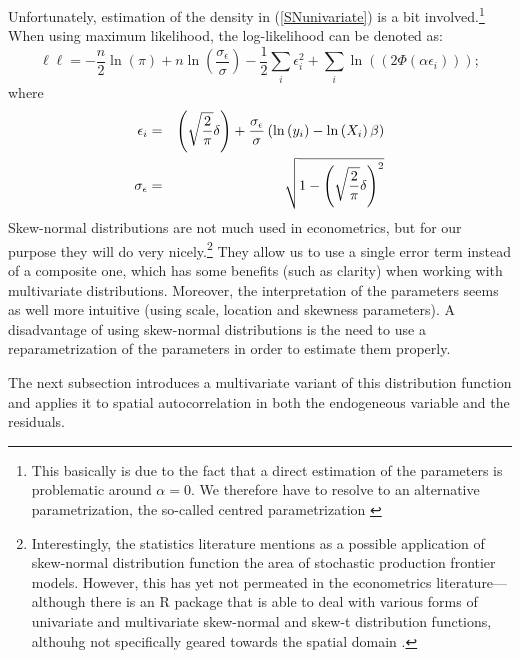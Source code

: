 \documentclass[11pt,parskip,abstracton,notitlepage]{scrartcl}
\begin{document}
Unfortunately, estimation of the density in (\ref{SNunivariate}) is a bit involved.\footnote{This basically is due to the fact that a direct estimation of the parameters is problematic around $\alpha = 0$. We therefore have to resolve to an alternative parametrization, the so-called centred parametrization \citep[see as well][]{arellano2008centred}} When using maximum likelihood, the log-likelihood can be denoted as:
%
\begin{equation}
\ell\ell  = - \frac{n}{2}\ln \left(\pi \right) + n \ln \left( \frac{\sigma_\epsilon }{\sigma}\right) - 	\frac{1}{2}\sum_i{\epsilon _i^2} + 
						  \sum_i{ \ln \left((2\Phi(\alpha \epsilon _i))\right)};
\label{eq:}
\end{equation}
%
where 
\begin{eqnarray}
\epsilon _i & =& \left(\sqrt \frac{2}{\pi}\delta\right)+\frac{\sigma_\epsilon }{\sigma} \left(\ln \left(y_i\right)  -\ln \left(X_i\right) \beta \right)\notag \\
\sigma_\epsilon  &=& \sqrt{1-\left(\sqrt \frac{2}{\pi}\delta\right)^2}
\label{eq:centeredparameters}
\end{eqnarray}
%
Skew-normal distributions are not much used in econometrics, but for our purpose they will do very nicely.\footnote{Interestingly, the statistics literature mentions as a possible application of skew-normal distribution function the area of stochastic production frontier models. However, this has yet not permeated in the econometrics literature---although there is an R package that is able to deal with various forms of univariate and multivariate skew-normal and skew-t distribution functions, althouhg not specifically geared towards the spatial domain \citep{packagesn}.} They allow us to use a single error term instead of a composite one, which has some benefits (such as clarity) when working with multivariate distributions. Moreover, the interpretation of the parameters seems as well more intuitive (using scale, location and skewness parameters). A disadvantage of using skew-normal distributions is the need to use a reparametrization of the parameters in order to estimate them properly.

The next subsection introduces a multivariate variant of this distribution function and applies it to spatial autocorrelation in both the endogeneous variable and the residuals.
%
\end{document}
